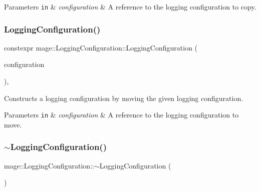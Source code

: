 \begin{DoxyParams}[1]{Parameters}
\mbox{\tt in}  & {\em configuration} & A reference to the logging configuration to copy. \\
\hline
\end{DoxyParams}
\hypertarget{classmage_1_1_logging_configuration_a7cd5793f3a568c82fe29c33ee66aeb14}{}\label{classmage_1_1_logging_configuration_a7cd5793f3a568c82fe29c33ee66aeb14} 
\subsubsection{\texorpdfstring{Logging\+Configuration()}{LoggingConfiguration()}\hspace{0.1cm}{\footnotesize\ttfamily [3/3]}}
{\footnotesize\ttfamily constexpr mage\+::\+Logging\+Configuration\+::\+Logging\+Configuration (\begin{DoxyParamCaption}\item[{\hyperlink{classmage_1_1_logging_configuration}{Logging\+Configuration} \&\&}]{configuration }\end{DoxyParamCaption})\hspace{0.3cm}{\ttfamily [default]}, {\ttfamily [noexcept]}}

Constructs a logging configuration by moving the given logging configuration.


\begin{DoxyParams}[1]{Parameters}
\mbox{\tt in}  & {\em configuration} & A reference to the logging configuration to move. \\
\hline
\end{DoxyParams}
\hypertarget{classmage_1_1_logging_configuration_a842cd1d5cf22c9fb6e2c76e684cd08ee}{}\label{classmage_1_1_logging_configuration_a842cd1d5cf22c9fb6e2c76e684cd08ee} 
\subsubsection{\texorpdfstring{$\sim$\+Logging\+Configuration()}{~LoggingConfiguration()}}
{\footnotesize\ttfamily mage\+::\+Logging\+Configuration\+::$\sim$\+Logging\+Configuration (\begin{DoxyParamCaption}{ }\end{DoxyParamCaption})\hspace{0.3cm}{\ttfamily [default]}}

